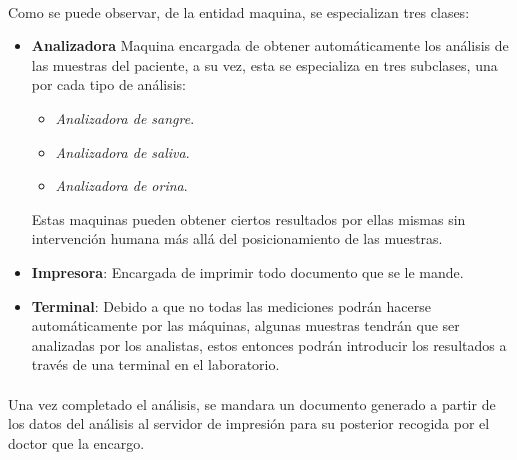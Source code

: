 \documentclass[a4paper,10pt]{article}
\begin{document}
\paragraph{}
Como se puede observar, de la entidad maquina, se especializan tres clases:
\begin{itemize}
\item {\bf Analizadora} Maquina encargada de obtener automáticamente los análisis de las muestras del paciente, a su vez, esta se especializa en tres subclases, una por cada tipo de análisis:
\begin{itemize}
\item {\it Analizadora de sangre}.
\item {\it Analizadora de saliva}.
\item {\it Analizadora de orina}.
\end{itemize}
Estas maquinas pueden obtener ciertos resultados por ellas mismas sin intervención humana más allá del posicionamiento de las muestras.
\item {\bf Impresora}: Encargada de imprimir todo documento que se le mande.
\item {\bf Terminal}: Debido a que no todas las mediciones podrán hacerse automáticamente por las máquinas, algunas muestras tendrán que ser analizadas por los analistas, estos entonces podrán introducir los resultados a través de una terminal en el laboratorio.
\end{itemize}
\paragraph{}
Una vez completado el análisis, se mandara un documento generado a partir de los datos del análisis al servidor de impresión para su posterior recogida por el doctor que la encargo.\\
\pagebreak

\end{document}
